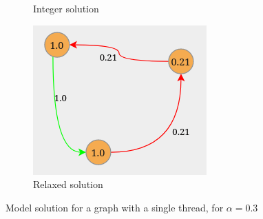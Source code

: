 \documentclass{beamer}
\begin{document}
\begin{frame}[c]
\begin{figure}
\begin{center}
\begin{subfigure}[b]{0.3\textwidth}
				\caption{Integer solution}
				\label{fig:img/graph-example1-2.png}
			\end{subfigure}
			\begin{subfigure}[b]{0.3\textwidth}
				\centering
				\includegraphics[width=\textwidth]{img/graph-example1-3.png}
				\caption{Relaxed solution}
				\label{fig:img/graph-example1-3.png}
			\end{subfigure}
		\end{center}
		\caption{Model solution for a graph with a single thread, for $\alpha =
				0.3$}
	\end{figure}

\end{frame}
\end{document}
